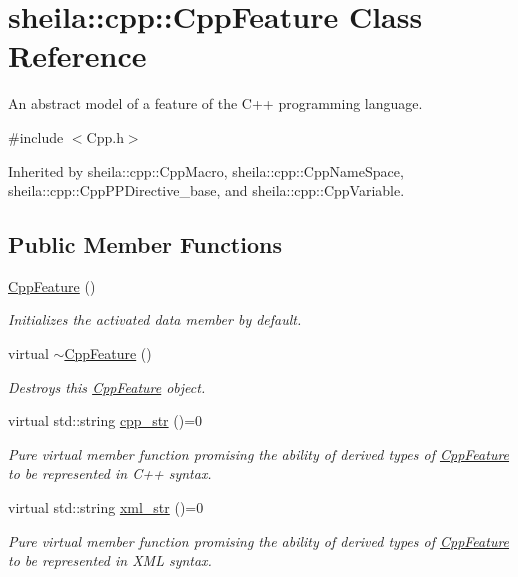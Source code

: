 \hypertarget{classsheila_1_1cpp_1_1CppFeature}{}\section{sheila\+:\+:cpp\+:\+:Cpp\+Feature Class Reference}
\label{classsheila_1_1cpp_1_1CppFeature}


An abstract model of a feature of the C++ programming language.  




{\ttfamily \#include $<$Cpp.\+h$>$}



Inherited by sheila\+::cpp\+::\+Cpp\+Macro, sheila\+::cpp\+::\+Cpp\+Name\+Space, sheila\+::cpp\+::\+Cpp\+P\+P\+Directive\+\_\+base, and sheila\+::cpp\+::\+Cpp\+Variable.

\subsection*{Public Member Functions}
\begin{DoxyCompactItemize}
\item 
\hyperlink{classsheila_1_1cpp_1_1CppFeature_aaa591b8778db1149698d72ac8dda6e41}{Cpp\+Feature} ()
\begin{DoxyCompactList}\small\item\em Initializes the {\itshape activated} data member by default. \end{DoxyCompactList}\item 
virtual \hyperlink{classsheila_1_1cpp_1_1CppFeature_ae5e92fe438202d8e5a7b0b1694596dd3}{$\sim$\+Cpp\+Feature} ()
\begin{DoxyCompactList}\small\item\em Destroys this \hyperlink{classsheila_1_1cpp_1_1CppFeature}{Cpp\+Feature} object. \end{DoxyCompactList}\item 
virtual std\+::string \hyperlink{classsheila_1_1cpp_1_1CppFeature_abe57540541227efa5c3e6ef2194276b9}{cpp\+\_\+str} ()=0
\begin{DoxyCompactList}\small\item\em Pure virtual member function promising the ability of derived types of {\ttfamily \hyperlink{classsheila_1_1cpp_1_1CppFeature}{Cpp\+Feature}} to be represented in C++ syntax. \end{DoxyCompactList}\item 
virtual std\+::string \hyperlink{classsheila_1_1cpp_1_1CppFeature_af32851fe8b1ce92bac4318605f0173db}{xml\+\_\+str} ()=0
\begin{DoxyCompactList}\small\item\em Pure virtual member function promising the ability of derived types of {\ttfamily \hyperlink{classsheila_1_1cpp_1_1CppFeature}{Cpp\+Feature}} to be represented in X\+ML syntax. \end{DoxyCompactList}\end{DoxyCompactItemize}
